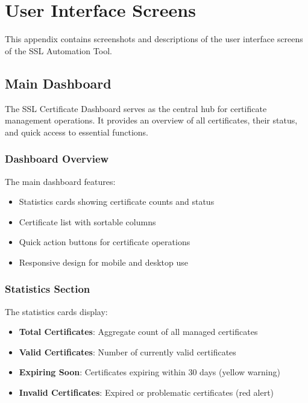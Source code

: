 
\chapter{User Interface Screens} %

\label{AppendixA} %


This appendix contains screenshots and descriptions of the user interface screens of the SSL Automation Tool.

\section{Main Dashboard}

The SSL Certificate Dashboard serves as the central hub for certificate management operations. It provides an overview of all certificates, their status, and quick access to essential functions.

\subsection{Dashboard Overview}

The main dashboard features:
\begin{itemize}
    \item Statistics cards showing certificate counts and status
    \item Certificate list with sortable columns
    \item Quick action buttons for certificate operations
    \item Responsive design for mobile and desktop use
\end{itemize}

\subsection{Statistics Section}

The statistics cards display:
\begin{itemize}
    \item \textbf{Total Certificates}: Aggregate count of all managed certificates
    \item \textbf{Valid Certificates}: Number of currently valid certificates
    \item \textbf{Expiring Soon}: Certificates expiring within 30 days (yellow warning)
    \item \textbf{Invalid Certificates}: Expired or problematic certificates (red alert)
\end{itemize}

